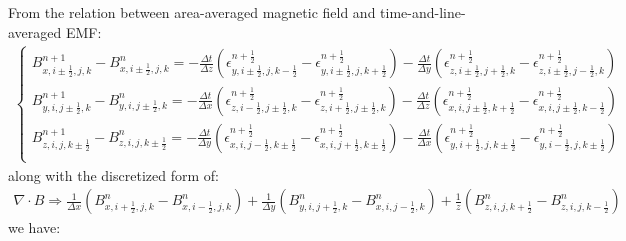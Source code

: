 \documentclass[a4paper,10pt]{article}
\begin{document}
From the relation between area-averaged magnetic field and time-and-line-averaged EMF:
\begin{align}
\begin{cases}
B_{x,i\pm\frac{1}{2},j,k}^{n+1}-B_{x,i\pm\frac{1}{2},j,k}^{n}=-\frac{\Delta t}{\Delta z}(\epsilon_{y,i\pm\frac{1}{2},j,k-\frac{1}{2}}^{n+\frac{1}{2}}-\epsilon_{y,i\pm\frac{1}{2},j,k+\frac{1}{2}}^{n+\frac{1}{2}})-\frac{\Delta t}{\Delta y}(\epsilon_{z,i\pm\frac{1}{2},j+\frac{1}{2},k}^{n+\frac{1}{2}}-\epsilon_{z,i\pm\frac{1}{2},j-\frac{1}{2},k}^{n+\frac{1}{2}}) \\
B_{y,i,j\pm\frac{1}{2},k}^{n+1}-B_{y,i,j\pm\frac{1}{2},k}^{n}=-\frac{\Delta t}{\Delta x}(\epsilon_{z,i-\frac{1}{2},j\pm\frac{1}{2},k}^{n+\frac{1}{2}}-\epsilon_{z,i+\frac{1}{2},j\pm\frac{1}{2},k}^{n+\frac{1}{2}})-\frac{\Delta t}{\Delta z}(\epsilon_{x,i,j\pm\frac{1}{2},k+\frac{1}{2}}^{n+\frac{1}{2}}-\epsilon_{x,i,j\pm\frac{1}{2},k-\frac{1}{2}}^{n+\frac{1}{2}}) \\
B_{z,i,j,k\pm\frac{1}{2}}^{n+1}-B_{z,i,j,k\pm\frac{1}{2}}^{n}=-\frac{\Delta t}{\Delta y}(\epsilon_{x,i,j-\frac{1}{2},k\pm\frac{1}{2}}^{n+\frac{1}{2}}-\epsilon_{x,i,j+\frac{1}{2},k\pm\frac{1}{2}}^{n+\frac{1}{2}})-\frac{\Delta t}{\Delta x}(\epsilon_{y,i+\frac{1}{2},j,k\pm\frac{1}{2}}^{n+\frac{1}{2}}-\epsilon_{y,i-\frac{1}{2},j,k\pm\frac{1}{2}}^{n+\frac{1}{2}})\\
\end{cases}
\end{align}
along with the discretized form of:
\begin{align}
\nabla \cdot B \Rightarrow\frac{1}{\Delta x}(B_{x,i+\frac{1}{2},j,k}^n-B_{x,i-\frac{1}{2},j,k}^n)+\frac{1}{\Delta y}(B_{y,i,j+\frac{1}{2},k}^n-B_{x,i,j-\frac{1}{2},k}^n)+\frac{1}{z}(B_{z,i,j,k+\frac{1}{2}}^n-B_{z,i,j,k-\frac{1}{2}}^n)
\end{align}
we have:
\end{document}

